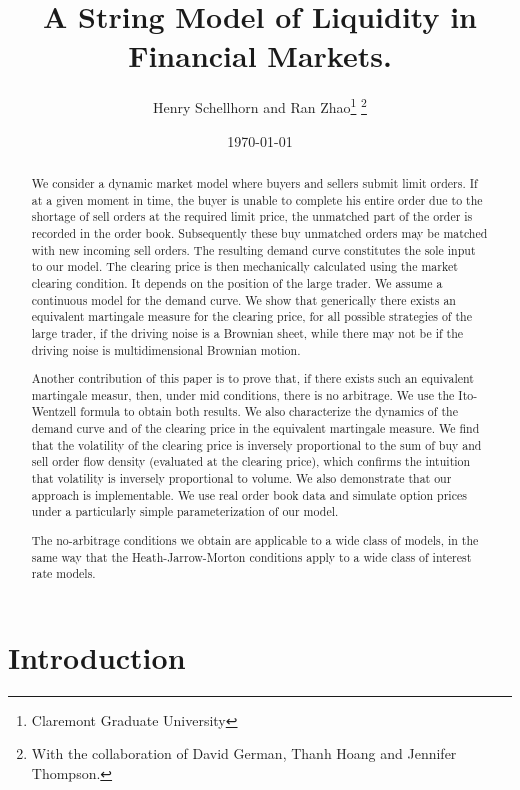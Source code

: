 \documentclass{article}
\begin{document}
\title{A String Model of Liquidity in Financial Markets.}
\author{Henry Schellhorn and Ran Zhao\thanks{%
Claremont Graduate University} \thanks{%
With the collaboration of David German, Thanh Hoang and Jennifer Thompson.}}
\date{\today }
\maketitle

\begin{abstract}
We consider a dynamic market model where buyers and sellers submit limit
orders. If at a given moment in time, the buyer is unable to complete his
entire order due to the shortage of sell orders at the required limit price,
the unmatched part of the order is recorded in the order book. Subsequently
these buy unmatched orders may be matched with new incoming sell orders. The
resulting demand curve constitutes the sole input to our model. The clearing
price is then mechanically calculated using the market clearing condition.
It depends on the position of the large trader. We assume a continuous model
for the demand curve. We show that generically there exists an equivalent
martingale measure for the clearing price, for all possible strategies of
the large trader, if the driving noise is a Brownian sheet, while there may
not be if the driving noise is multidimensional Brownian motion.

Another contribution of this paper is to prove that, if there exists such an
equivalent martingale measur, then, under mid conditions, there is no
arbitrage. We use the Ito-Wentzell formula to obtain both results. We also
characterize the dynamics of the demand curve and of the clearing price in
the equivalent martingale measure. We find that the volatility of the
clearing price is inversely proportional to the sum of buy and sell order
flow density (evaluated at the clearing price), which confirms the intuition
that volatility is inversely proportional to volume. We also demonstrate
that our approach is implementable. We use real order book data and simulate
option prices under a particularly simple parameterization of our model.

The no-arbitrage conditions we obtain are applicable to a wide class of
models, in the same way that the Heath-Jarrow-Morton conditions apply to a
wide class of interest rate models.
\end{abstract}

\section{Introduction}
\end{document}
